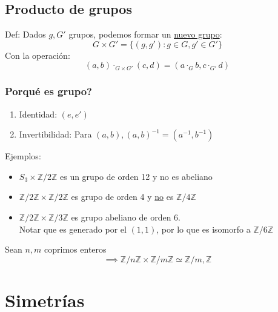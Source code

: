 \documentclass[11pt]{book}
\theoremstyle{definition}
\begin{document}
\section{Producto de grupos}
Def: Dados $g,G'$ grupos, podemos formar un \underline{nuevo grupo}:
\[
G\times G'=\{(g,g'):g\in G,g'\in G'\}
\]
Con la operación:
\[
(a,b)\cdot_{G\times G'}(c,d)=(a\cdot_G b,c\cdot_{G'} d)
\]
\subsection{Porqué es grupo?}
\begin{enumerate}[label=(\alph*)]
	\item Identidad: $(e,e')$
	
	\item Invertibilidad: Para $(a,b),(a,b)^{-1}=(a^{-1},b^{-1})$
\end{enumerate}
Ejemplos:
\begin{itemize}
	\item $S_3\times\mathbb{Z}/2\mathbb{Z}$ es un grupo de orden 12 y no es abeliano
	
	\item $\mathbb{Z}/2\mathbb{Z}\times\mathbb{Z}/2\mathbb{Z}$ es grupo de orden 4 y \underline{no} es $\mathbb{Z}/4\mathbb{Z}$
	
	\item $\mathbb{Z}/2\mathbb{Z}\times\mathbb{Z}/3\mathbb{Z}$ es grupo abeliano de orden 6.\\
	Notar que es generado por el $(1,1)$, por lo que es isomorfo a $\mathbb{Z}/6\mathbb{Z}$
\end{itemize}
Sean $n,m$ coprimos enteros
\[
\implies \mathbb{Z}/n\mathbb{Z}\times\mathbb{Z}/m\mathbb{Z}\simeq\mathbb{Z}/m,\mathbb{Z}
\]

\chapter{Simetrías}
\end{document}
